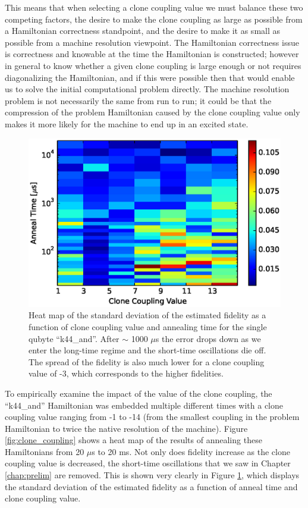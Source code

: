 This means that when selecting a clone coupling value we must balance these two competing factors, the desire to make the clone coupling as large as possible from a Hamiltonian correctness standpoint, and the desire to make it as small as possible from a machine resolution viewpoint.  The Hamiltonian correctness issue is correctness and knowable at the time the Hamiltonian is constructed; however in general to know whether a given clone coupling is large enough or not requires diagonalizing the Hamiltonian, and if this were possible then that would enable us to solve the initial computational problem directly.
The machine resolution problem is not necessarily the same from run to run; it could be that the compression of the problem Hamiltonian caused by the clone coupling value only makes it more likely for the machine to end up in an excited state.

\begin{figure}
	\includegraphics{img/t_c.eps}
	\caption[Fidelity Standard Deviation]{Heat map of the standard deviation of the estimated fidelity as a function of clone coupling value and annealing time for the single qubyte ``k44\_and''.  After $\sim$ 1000 $\mu$s the error drops down as we enter the long-time regime and the short-time oscillations die off.  The spread of the fidelity is also much lower for a clone coupling value of -3, which corresponds to the higher fidelities.}
	\label{fig:std_time}
\end{figure}

To empirically examine the impact of the value of the clone coupling, the ``k44\_and'' Hamiltonian was embedded multiple different times with a clone coupling value ranging from -1 to -14 (from the smallest coupling in the problem Hamiltonian to twice the native resolution of the machine).  Figure \ref{fig:clone_coupling} shows a heat map of the results of annealing these Hamiltonians from 20 $\mu$s to 20 ms.  Not only does fidelity increase as the clone coupling value is decreased, the short-time oscillations that we saw in Chapter \ref{chap:prelim} are removed.  This is shown very clearly in Figure \ref{fig:std_time}, which displays the standard deviation of the estimated fidelity as a function of anneal time and clone coupling value.

